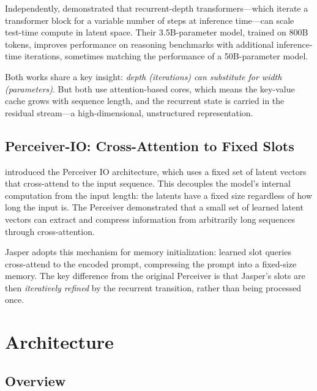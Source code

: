 \documentclass[11pt,a4paper]{article}
\begin{document}
Independently, \citet{geiping2025recurrent} demonstrated that recurrent-depth transformers---which iterate a transformer block for a variable number of steps at inference time---can scale test-time compute in latent space. Their 3.5B-parameter model, trained on 800B tokens, improves performance on reasoning benchmarks with additional inference-time iterations, sometimes matching the performance of a 50B-parameter model.

Both works share a key insight: \emph{depth (iterations) can substitute for width (parameters)}. But both use attention-based cores, which means the key-value cache grows with sequence length, and the recurrent state is carried in the residual stream---a high-dimensional, unstructured representation.

\subsection{Perceiver-IO: Cross-Attention to Fixed Slots}

\citet{jaegle2022perceiverio} introduced the Perceiver IO architecture, which uses a fixed set of latent vectors that cross-attend to the input sequence. This decouples the model's internal computation from the input length: the latents have a fixed size regardless of how long the input is. The Perceiver demonstrated that a small set of learned latent vectors can extract and compress information from arbitrarily long sequences through cross-attention.

Jasper adopts this mechanism for memory initialization: learned slot queries cross-attend to the encoded prompt, compressing the prompt into a fixed-size memory. The key difference from the original Perceiver is that Jasper's slots are then \emph{iteratively refined} by the recurrent transition, rather than being processed once.

\section{Architecture}
\label{sec:architecture}

\subsection{Overview}
\end{document}
